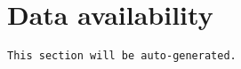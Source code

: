 \documentclass[10pt,a4paper,twocolumn]{article}
\begin{document}


\title{}



\maketitle
\thispagestyle{fancy}

\begin{abstract}

\end{abstract}
\clearpage







\section*{Data availability}

\texttt{This section will be auto-generated.}










{\small
}
\end{document}
